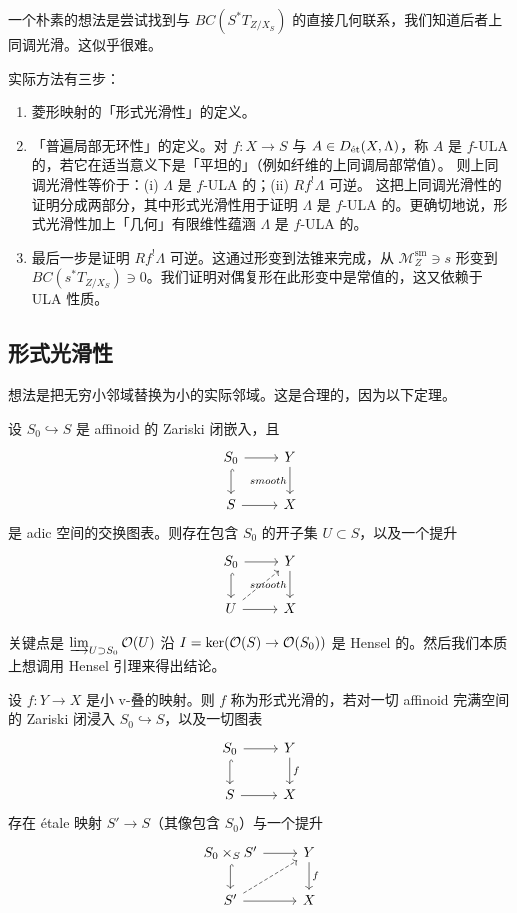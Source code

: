 一个朴素的想法是尝试找到与 $BC(S^*T_{Z/X_S})$ 的直接几何联系，我们知道后者上同调光滑。这似乎很难。

实际方法有三步：
\begin{enumerate}[label=(\arabic*)]
\item 菱形映射的「形式光滑性」的定义。
\item 「普遍局部无环性」的定义。对 $f\colon X\to S$ 与 $A\in D_{\et}(X,\Lambda)$，称 $A$ 是 $f$-ULA 的，若它在适当意义下是「平坦的」（例如纤维的上同调局部常值）。
则上同调光滑性等价于：(i) $\Lambda$ 是 $f$-ULA 的；(ii) $Rf^!\Lambda$ 可逆。
这把上同调光滑性的证明分成两部分，其中形式光滑性用于证明 $\Lambda$ 是 $f$-ULA 的。更确切地说，形式光滑性加上「几何」有限维性蕴涵 $\Lambda$ 是 $f$-ULA 的。
\item 最后一步是证明 $Rf^!\Lambda$ 可逆。这通过形变到法锥来完成，从 $\mathcal{M}^{\mathrm{sm}}_Z\ni s$ 形变到 $BC(s^*T_{Z/X_S})\ni0$。我们证明对偶复形在此形变中是常值的，这又依赖于 ULA 性质。
\end{enumerate}

\subsection{形式光滑性}

想法是把无穷小邻域替换为小的实际邻域。这是合理的，因为以下定理。

\begin{theorem}
设 $S_0\hookrightarrow S$ 是 affinoid 的 Zariski 闭嵌入，且
\[
\begin{tikzcd}
S_0 \arrow[r] \arrow[d, hook] & Y \arrow[d, "smooth"'] \\
S \arrow[r] & X
\end{tikzcd}
\]
是 adic 空间的交换图表。则存在包含 $S_0$ 的开子集 $U\subset S$，以及一个提升
\[
\begin{tikzcd}
S_0 \arrow[r] \arrow[d, hook] & Y \arrow[d, "smooth"'] \\
U \arrow[r] \arrow[ur, dashed] & X
\end{tikzcd}
\]
\end{theorem}


关键点是 $\varinjlim_{U\supset S_0}\cO(U)$ 沿 $I=\ker(\cO(S)\to\cO(S_0))$ 是 Hensel 的。然后我们本质上想调用 Hensel 引理来得出结论。

\begin{definition}
设 $f\colon Y\to X$ 是小 v-叠的映射。则 $f$ 称为形式光滑的，若对一切 affinoid 完满空间的 Zariski 闭浸入 $S_0\hookrightarrow S$，以及一切图表
\[
\begin{tikzcd}
S_0 \arrow[r] \arrow[d, hook] & Y \arrow[d, "f"] \\
S \arrow[r] & X
\end{tikzcd}
\]
存在 étale 映射 $S'\to S$（其像包含 $S_0$）与一个提升
\[
\begin{tikzcd}
S_0\times_S S' \arrow[r] \arrow[d, hook] & Y \arrow[d, "f"] \\
S' \arrow[r] \arrow[ur, dashed] & X
\end{tikzcd}
\]
\end{definition}

